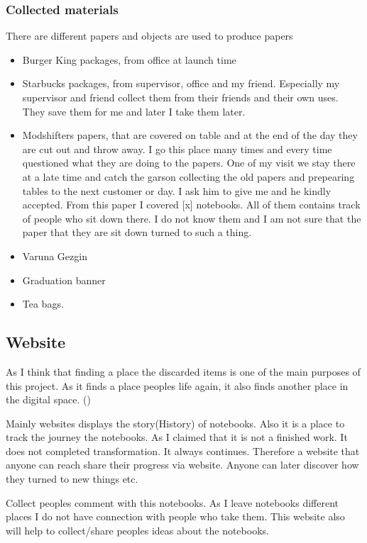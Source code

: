 \subsubsection{Collected materials}
There are different papers and objects are used to produce papers
\begin{itemize}
\item Burger King packages, from office at launch time
\item Starbucks packages, from supervisor, office and my friend. Especially my supervisor and friend collect them from their friends and their own uses. They save them for me and later I take them later. 
\item Modshifters papers, that are covered on table and at the end of the day they are cut out and throw away. I go this place many times and every time questioned what they are doing to the papers. One of my visit we stay there at a late time and catch the garson collecting the old papers and prepearing tables to the next customer or day. I ask him to give me and he kindly accepted. From this paper I covered [x] notebooks. All of them contains track of people who sit down there. I do not know them and I am not sure that the paper that they are sit down turned to such a thing. 
\item Varuna Gezgin
\item Graduation banner
\item Tea bags.
\end{itemize}

\subsection{Website}
As I think that finding a place the discarded items is one of the main purposes of this project. As it finds a place peoples life again, it also finds another place in the digital space. ()

Mainly websites displays the story(History) of notebooks. Also it is a place to track the journey the notebooks. As I claimed that it is not a finished work. It does not completed transformation. It always continues. Therefore a website that anyone can reach share their progress via website. Anyone can later discover how they turned to new things etc. 

Collect peoples comment with this notebooks. As I leave notebooks different places I do not have connection with people who take them. This website also will help to collect/share peoples ideas about the notebooks.

